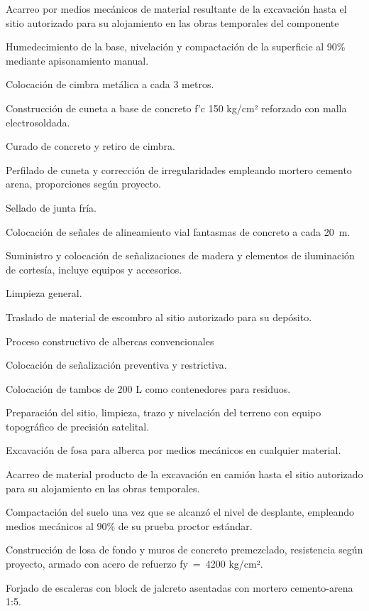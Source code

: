 \documentclass{article}
\begin{document}
Acarreo por medios mecánicos de material resultante de la excavación hasta el sitio autorizado para su alojamiento en las obras temporales del componente

Humedecimiento de la base, nivelación y compactación de la superficie al 90\% mediante apisonamiento manual.

Colocación de cimbra metálica a cada 3 metros.

Construcción de cuneta a base de concreto f’c 150 kg/cm² reforzado con malla electrosoldada.

Curado de concreto y retiro de cimbra.

Perfilado de cuneta y corrección de irregularidades empleando mortero cemento arena, proporciones según proyecto.

Sellado de junta fría.

Colocación de señales de alineamiento vial fantasmas de concreto a cada 20~m.

Suministro y colocación de señalizaciones de madera y elementos de iluminación de cortesía, incluye equipos y accesorios.

Limpieza general.

Traslado de material de escombro al sitio autorizado para su depósito.


\bigskip


\bigskip

Proceso constructivo de albercas convencionales


\bigskip

Colocación de señalización preventiva y restrictiva.

Colocación de tambos de 200 L como contenedores para residuos.

Preparación del sitio, limpieza, trazo y nivelación del terreno con equipo topográfico de precisión satelital.

Excavación de fosa para alberca por medios mecánicos en cualquier material.

Acarreo de material producto de la excavación en camión hasta el sitio autorizado para su alojamiento en las obras temporales.

Compactación del suelo una vez que se alcanzó el nivel de desplante, empleando medios mecánicos al 90\% de su prueba proctor estándar.

Construcción de losa de fondo y muros de concreto premezclado, resistencia según proyecto, armado con acero de refuerzo fy~=~4200 kg/cm².

Forjado de escaleras con block de jalcreto asentadas con mortero cemento-arena 1:5.
\end{document}
